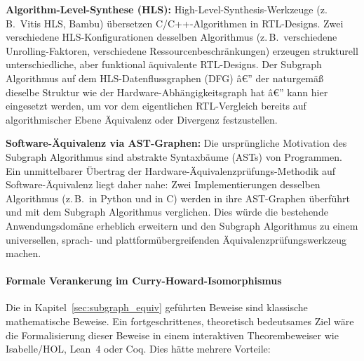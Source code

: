 ﻿\documentclass[12pt,a4paper]{report}
\begin{document}
\textbf{Algorithm-Level-Synthese (HLS):} High-Level-Synthesis-Werkzeuge (z.\,B.\ Vitis HLS,
Bambu) übersetzen C/C++-Algorithmen in RTL-Designs. Zwei verschiedene
HLS-Konfigurationen desselben Algorithmus (z.\,B.\ verschiedene Unrolling-Faktoren,
verschiedene Ressourcenbeschränkungen) erzeugen strukturell unterschiedliche, aber
funktional äquivalente RTL-Designs. Der Subgraph Algorithmus auf dem HLS-Datenflussgraphen
(DFG) â€” der naturgemäß dieselbe Struktur wie der Hardware-Abhängigkeitsgraph hat â€”
kann hier eingesetzt werden, um vor dem eigentlichen RTL-Vergleich bereits auf
algorithmischer Ebene Äquivalenz oder Divergenz festzustellen.

\textbf{Software-Äquivalenz via AST-Graphen:} Die ursprüngliche Motivation des Subgraph
Algorithmus \cite{subgraph2026} sind abstrakte Syntaxbäume (ASTs) von Programmen.
Ein unmittelbarer Übertrag der Hardware-Äquivalenzprüfungs-Methodik auf
Software-Äquivalenz liegt daher nahe: Zwei Implementierungen desselben Algorithmus
(z.\,B.\ in Python und in C) werden in ihre AST-Graphen überführt und mit dem Subgraph
Algorithmus verglichen. Dies würde die bestehende Anwendungsdomäne erheblich
erweitern und den Subgraph Algorithmus zu einem universellen, sprach- und
plattformübergreifenden Äquivalenzprüfungswerkzeug machen.

\paragraph{Formale Verankerung im Curry-Howard-Isomorphismus}

Die in Kapitel~\ref{sec:subgraph_equiv} geführten Beweise sind klassische
mathematische Beweise. Ein fortgeschrittenes, theoretisch bedeutsames Ziel wäre die
Formalisierung dieser Beweise in einem interaktiven Theorembeweiser wie Isabelle/HOL,
Lean~4 oder Coq. Dies hätte mehrere Vorteile:
\end{document}
